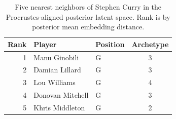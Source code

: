 \begin{table}[htbp]
  \centering\small
  \begin{tabular}{rllc}
    \toprule
    Rank & Player & Position & Archetype \\
    \midrule
    1 & Manu Ginobili & G & 3 \\
    2 & Damian Lillard & G & 3 \\
    3 & Lou Williams & G & 4 \\
    4 & Donovan Mitchell & G & 3 \\
    5 & Khris Middleton & G & 2 \\
    \bottomrule
  \end{tabular}
  \caption{Five nearest neighbors of Stephen Curry in the Procrustes-aligned posterior latent space. Rank is by posterior mean embedding distance.}
  \label{tab:Stephen_Curry_neighbors}
\end{table}

